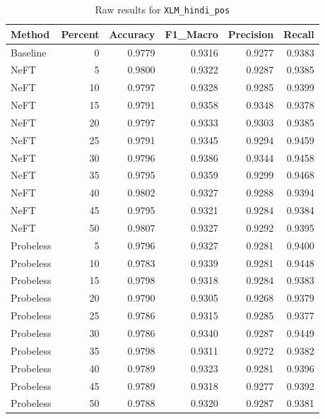 \documentclass[12pt]{article}
\begin{document}
\begin{table}[H]
\centering
\caption{Raw results for \texttt{XLM\_hindi\_pos}}
\label{tab:xlm-hindi-pos}
\begin{tabular}{lrrrrr}
\toprule
Method & Percent & Accuracy & F1\_Macro & Precision & Recall \\
\midrule
Baseline & 0 & 0.9779 & 0.9316 & 0.9277 & 0.9383 \\
NeFT & 5 & 0.9800 & 0.9322 & 0.9287 & 0.9385 \\
NeFT & 10 & 0.9797 & 0.9328 & 0.9285 & 0.9399 \\
NeFT & 15 & 0.9791 & 0.9358 & 0.9348 & 0.9378 \\
NeFT & 20 & 0.9797 & 0.9333 & 0.9303 & 0.9385 \\
NeFT & 25 & 0.9791 & 0.9345 & 0.9294 & 0.9459 \\
NeFT & 30 & 0.9796 & 0.9386 & 0.9344 & 0.9458 \\
NeFT & 35 & 0.9795 & 0.9359 & 0.9299 & 0.9468 \\
NeFT & 40 & 0.9802 & 0.9327 & 0.9288 & 0.9394 \\
NeFT & 45 & 0.9795 & 0.9321 & 0.9284 & 0.9384 \\
NeFT & 50 & 0.9807 & 0.9327 & 0.9292 & 0.9395 \\
Probeless & 5 & 0.9796 & 0.9327 & 0.9281 & 0.9400 \\
Probeless & 10 & 0.9783 & 0.9339 & 0.9281 & 0.9448 \\
Probeless & 15 & 0.9798 & 0.9318 & 0.9284 & 0.9383 \\
Probeless & 20 & 0.9790 & 0.9305 & 0.9268 & 0.9379 \\
Probeless & 25 & 0.9786 & 0.9315 & 0.9285 & 0.9377 \\
Probeless & 30 & 0.9786 & 0.9340 & 0.9287 & 0.9449 \\
Probeless & 35 & 0.9798 & 0.9311 & 0.9272 & 0.9382 \\
Probeless & 40 & 0.9789 & 0.9323 & 0.9281 & 0.9396 \\
Probeless & 45 & 0.9789 & 0.9318 & 0.9277 & 0.9392 \\
Probeless & 50 & 0.9788 & 0.9320 & 0.9287 & 0.9381 \\
\bottomrule
\end{tabular}
\end{table}
\end{document}
